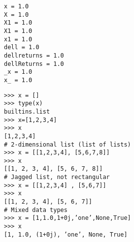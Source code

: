 
\begin{framed}
\begin{verbatim}
x = 1.0
X = 1.0
X1 = 1.0
X1 = 1.0
x1 = 1.0
dell = 1.0
dellreturns = 1.0
dellReturns = 1.0
_x = 1.0
x_ = 1.0
\end{verbatim}
\end{framed}



\begin{framed}
\begin{verbatim}
>>> x = []
>>> type(x)
builtins.list
>>> x=[1,2,3,4]
>>> x
[1,2,3,4]
# 2-dimensional list (list of lists)
>>> x = [[1,2,3,4], [5,6,7,8]]
>>> x
[[1, 2, 3, 4], [5, 6, 7, 8]]
# Jagged list, not rectangular
>>> x = [[1,2,3,4] , [5,6,7]]
>>> x
[[1, 2, 3, 4], [5, 6, 7]]
# Mixed data types
>>> x = [1,1.0,1+0j,’one’,None,True]
>>> x
[1, 1.0, (1+0j), ’one’, None, True]

\end{verbatim}
\end{framed}



